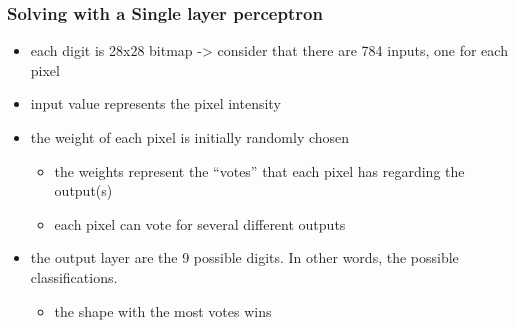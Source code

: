 \documentclass[xcolor=table]{beamer}
\begin{document}
\begin{mdframe}%

\frametitle{Solving with a Single layer perceptron}\label{heading-sec-solving-with-a-single-layer-perceptron}%

\begin{itemize}[noitemsep,topsep=\mdcompacttopsep]%

\item{}
each digit is 28x28 bitmap -\textgreater{} consider that there are 784 inputs, one for each pixel%

\item{}
input value represents the pixel intensity%

\item{}the weight of each pixel is initially randomly chosen

\begin{itemize}[noitemsep,topsep=\mdcompacttopsep]%

\item{}the weights represent the \textquotedblleft{}votes\textquotedblright{} that each pixel has regarding the output(s)%

\item{}each pixel can vote for several different outputs%
\end{itemize}%

\item{}the output layer are the 9 possible digits. In other words, the possible classifications.

\begin{itemize}[noitemsep,topsep=\mdcompacttopsep]%

\item{}the shape with the most votes wins%
\end{itemize}%
\end{itemize}%
\end{mdframe}\label{sec-solving-with-a-single-layer-perceptron}%
\end{document}
